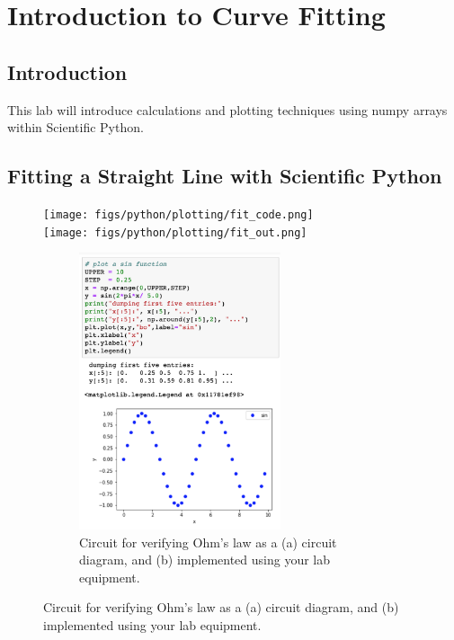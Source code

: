 \chapter{Introduction to Curve Fitting}

\section{Introduction}
This lab will introduce calculations and plotting techniques using numpy arrays within Scientific Python.

\section{Fitting a Straight Line with Scientific Python}

\begin{figure}[htbp]
\begin{center}
\texttt{[image: figs/python/plotting/fit\_code.png]} \\
\texttt{[image: figs/python/plotting/fit\_out.png]} \\
\caption{Example fitting data to linear relationship.}
\label{fig:plotsin}
\end{center}


\begin{figure}[htbp]
\begin{center}
\includegraphics[width=0.65\textwidth]{figs/python/plotting/plotting.png} 
\caption{Circuit for verifying Ohm's law as a (a) circuit diagram, and (b) implemented using your lab equipment.}
\label{fig:plotsin}
\end{center}


\end{figure}
\end{figure}
